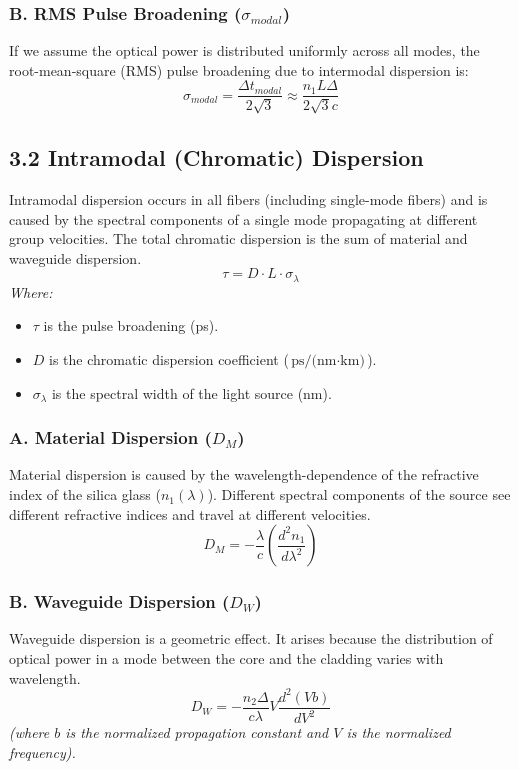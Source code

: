 \subsubsection{B. RMS Pulse Broadening ($\sigma_{modal}$)}
If we assume the optical power is distributed uniformly across all modes, the root-mean-square (RMS) pulse broadening due to intermodal dispersion is:
\[ \sigma_{modal} = \frac{\Delta t_{modal}}{2\sqrt{3}} \approx \frac{n_1 L \Delta}{2\sqrt{3} c} \]

\subsection{3.2 Intramodal (Chromatic) Dispersion}
Intramodal dispersion occurs in all fibers (including single-mode fibers) and is caused by the spectral components of a single mode propagating at different group velocities. The total chromatic dispersion is the sum of material and waveguide dispersion.
\[ \tau = D \cdot L \cdot \sigma_\lambda \]
\textit{Where:}
\begin{itemize}
  \item   $\tau$ is the pulse broadening (ps).
  \item   $D$ is the chromatic dispersion coefficient ($\text{ps/(nm}\cdot\text{km)}$).
  \item   $\sigma_\lambda$ is the spectral width of the light source (nm).
\end{itemize}

\subsubsection{A. Material Dispersion ($D_M$)}
Material dispersion is caused by the wavelength-dependence of the refractive index of the silica glass ($n_1(\lambda)$). Different spectral components of the source see different refractive indices and travel at different velocities.
\[ D_M = -\frac{\lambda}{c} \left( \frac{d^2 n_1}{d\lambda^2} \right) \]

\subsubsection{B. Waveguide Dispersion ($D_W$)}
Waveguide dispersion is a geometric effect. It arises because the distribution of optical power in a mode between the core and the cladding varies with wavelength.
\[ D_W = -\frac{n_2 \Delta}{c \lambda} V \frac{d^2(Vb)}{dV^2} \]
\textit{(where $b$ is the normalized propagation constant and $V$ is the normalized frequency).}

